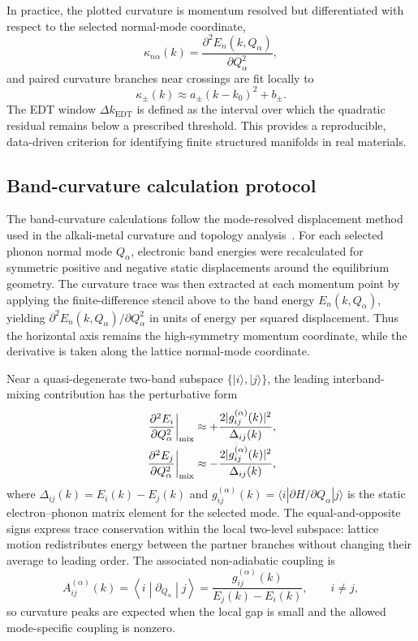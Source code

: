 ﻿\documentclass[aps,prx,reprint,superscriptaddress,longbibliography,floatfix]{revtex4-2}
\begin{document}
In practice, the plotted curvature is momentum resolved but differentiated with respect to the selected normal-mode coordinate,
\begin{equation}
\kappa_{n\alpha}(k) =
\frac{\partial^2 E_n(k,Q_\alpha)}{\partial Q_\alpha^2},
\end{equation}
and paired curvature branches near crossings are fit locally to
\begin{equation}
\kappa_\pm(k) \approx a_\pm (k-k_0)^2 + b_\pm .
\end{equation}
The EDT window $\Delta k_{\mathrm{EDT}}$ is defined as the interval over which the quadratic residual remains below a prescribed threshold. This provides a reproducible, data-driven criterion for identifying finite structured manifolds in real materials.

\subsection{Band-curvature calculation protocol}

The band-curvature calculations follow the mode-resolved displacement method used in the alkali-metal curvature and topology analysis~\cite{Hu2026_JPCM}. For each selected phonon normal mode $Q_\alpha$, electronic band energies were recalculated for symmetric positive and negative static displacements around the equilibrium geometry. The curvature trace was then extracted at each momentum point by applying the finite-difference stencil above to the band energy $E_n(k,Q_\alpha)$, yielding $\partial^2 E_n(k,Q_\alpha)/\partial Q_\alpha^2$ in units of energy per squared displacement. Thus the horizontal axis remains the high-symmetry momentum coordinate, while the derivative is taken along the lattice normal-mode coordinate.

Near a quasi-degenerate two-band subspace $\{|i\rangle,|j\rangle\}$, the leading interband-mixing contribution has the perturbative form
\begin{align}
\left.\frac{\partial^2 E_i}{\partial Q_\alpha^2}\right|_{\rm mix}
&\approx +\frac{2|g_{ij}^{(\alpha)}(k)|^2}{\Delta_{ij}(k)},\\
\left.\frac{\partial^2 E_j}{\partial Q_\alpha^2}\right|_{\rm mix}
&\approx -\frac{2|g_{ij}^{(\alpha)}(k)|^2}{\Delta_{ij}(k)},
\end{align}
where $\Delta_{ij}(k)=E_i(k)-E_j(k)$ and $g_{ij}^{(\alpha)}(k)=\langle i|\partial H/\partial Q_\alpha|j\rangle$ is the static electron--phonon matrix element for the selected mode. The equal-and-opposite signs express trace conservation within the local two-level subspace: lattice motion redistributes energy between the partner branches without changing their average to leading order. The associated non-adiabatic coupling is
\begin{equation}
A_{ij}^{(\alpha)}(k)
=
\left\langle i\middle|\partial_{Q_\alpha}\middle|j\right\rangle
=
\frac{g_{ij}^{(\alpha)}(k)}{E_j(k)-E_i(k)},\qquad i\neq j,
\end{equation}
so curvature peaks are expected when the local gap is small and the allowed mode-specific coupling is nonzero.
\end{document}
